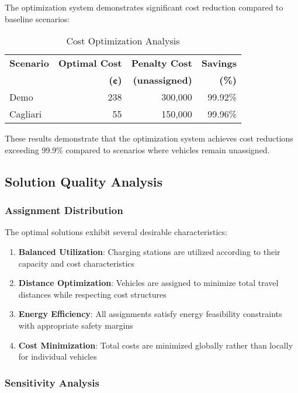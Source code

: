 \documentclass[12pt,a4paper]{article}
\begin{document}
The optimization system demonstrates significant cost reduction compared to baseline scenarios:

\begin{table}[H]
\centering
\caption{Cost Optimization Analysis}
\label{tab:cost_analysis}
\begin{tabular}{@{}lrrr@{}}
\toprule
\textbf{Scenario} & \textbf{Optimal Cost} & \textbf{Penalty Cost} & \textbf{Savings} \\
                  & \textbf{(¢)} & \textbf{(unassigned)} & \textbf{(\%)} \\
\midrule
Demo & 238 & 300,000 & 99.92\% \\
Cagliari & 55 & 150,000 & 99.96\% \\
\bottomrule
\end{tabular}
\end{table}

These results demonstrate that the optimization system achieves cost reductions exceeding 99.9\% compared to scenarios where vehicles remain unassigned.

\subsection{Solution Quality Analysis}

\subsubsection{Assignment Distribution}

The optimal solutions exhibit several desirable characteristics:

\begin{enumerate}
\item \textbf{Balanced Utilization}: Charging stations are utilized according to their capacity and cost characteristics
\item \textbf{Distance Optimization}: Vehicles are assigned to minimize total travel distances while respecting cost structures
\item \textbf{Energy Efficiency}: All assignments satisfy energy feasibility constraints with appropriate safety margins
\item \textbf{Cost Minimization}: Total costs are minimized globally rather than locally for individual vehicles
\end{enumerate}

\subsubsection{Sensitivity Analysis}
\end{document}
